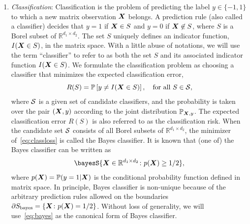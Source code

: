 \documentclass[12pt]{article}
\begin{document}
\begin{enumerate}[label={2.\arabic*},wide, labelwidth=!, labelindent=0pt]
\item {\it Classification}: Classification is the problem of predicting the label $y\in \{-1,1\}$ to which a new matrix observation $\bm X$ belongs. A prediction rule (also called a classifier) decides that $y=1$ if $\bm X\in S$ and $y=0$ if $\bm X \not\in S$, where $S$ is a Borel subset of $\mathbb{R}^{d_1\times d_2}$. The set $S$ uniquely defines an indicator function, $I(\bm X\in S)$, in the matrix space. With a little abuse of notations, we will use the term ``classifier'' to refer to as both the set $S$ and its associated indicator function $I(\bm X\in S)$.
We formulate the classification problem as choosing a classifier that minimizes the expected classification error,
\begin{equation}\label{eq:classloss}
R(S)=\mathbb{P}\left[y\neq I(\bm X\in S)\right], \quad \text{for all}\ S\in\mathcal{S},
\end{equation}
where $\mathcal{S}$ is a given set of candidate classifiers, and the probability is taken over the pair $(\bm X,y)$ according to the joint distribution $\mathbb{P}_{\bm X,y}$.
The expected classification error $R(S)$ is also referred to as the classification risk. %
When the candidate set $\mathcal{S}$ consists of all Borel subsets of $\mathbb{R}^{d_1\times d_2}$, the minimizer of~\eqref{eq:classloss} is called the Bayes classifier. It is known that (one of) the Bayes classifier can be written as 
\begin{equation}\label{eq:bayes}
\bayesS\{\mX\in\mathbb{R}^{d_1\times d_2}\colon p(\mX)\geq 1/2\},
\end{equation}
where $p(\bm X)=\mathbb{P}(y=1|\bm X)$ is the conditional probability function defined in matrix space. In principle, Bayes classifier is non-unique because of the arbitrary prediction rules allowed on the boundaries $\partial S_{\text{bayes}} = \{\bm X\colon p(\bm X)=1/2\}$. Without loss of generality, we will use~\eqref{eq:bayes} as the canonical form of Bayes classifier. 


\end{enumerate}
\end{document}

